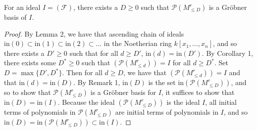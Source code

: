 \documentclass[12pt]{article}
\newenvironment{theorem}[2][Theorem]{\begin{trivlist}
\item[\hskip \labelsep {\bfseries #1}\hskip \labelsep {\bfseries #2.}]}{\end{trivlist}}
\newcommand{\init}{\text{in}}
\newcommand{\Poly}{\mathscr{P}}
\newcommand{\F}{\mathcal{F}}
\begin{document}
\begin{theorem}{1}
	For an ideal $I = (\F)$, there exists a $D \geq 0$ such that $\Poly(M_{\leq D}^r)$ is a Gröbner basis of $I$. 
\end{theorem}

\begin{proof}
	By Lemma 2, we have that ascending chain of ideals $\init(0) \subset \init(1) \subset \init(2) \subset \dots$ in the Noetherian ring $k[x_1, \dots, x_n]$, and so there exists a $D' \geq 0$ such that for all $d \geq D'$, $\init(d) = \init(D')$. By Corollary 1, there exists some $D^* \geq 0$ such that $(\Poly(M_{\leq d}^r)) = I$ for all $d \geq D^*$. Set $D = \max \{D', D^*\}$. Then for all $d \geq D$, we have that $(\Poly(M_{\leq d}^r)) = I$ and that $\init(d) = \init(D)$. By Remark 1, $\init(D)$ is the set $\init(\Poly(M_{\leq D}^r))$, and so to show that $\Poly(M_{\leq D}^r)$ is a Gröbner basis for $I$, it suffices to show that $\init(D) = \init(I)$. Because the ideal $(\Poly(M_{\leq D}^r))$ is the ideal $I$, all initial terms of polynomials in $\Poly(M_{\leq D}^r)$ are initial terms of polynomials in $I$, and so $\init(D) = \init(\Poly(M_{\leq D}^r)) \subset \init(I)$. 


\end{proof}
\end{document}
